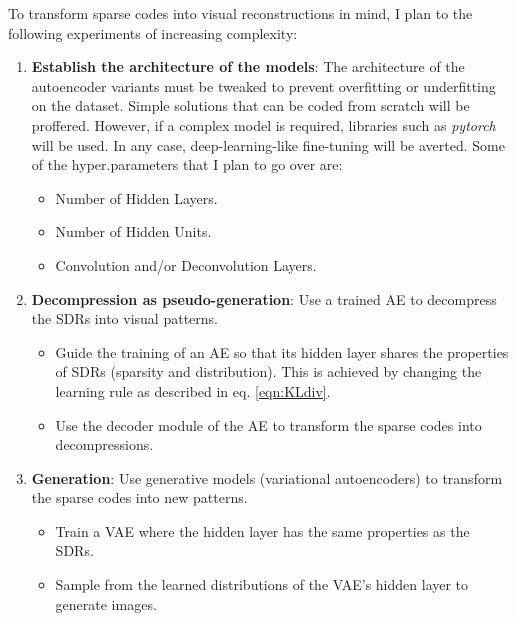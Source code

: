 \documentclass[runningheads]{llncs}
\begin{document}
To transform sparse codes into visual reconstructions in mind, I plan to the following experiments of increasing complexity:
\begin{enumerate}

    \item \textbf{Establish the architecture of the models}: The architecture of the autoencoder variants must be tweaked to prevent overfitting or underfitting on the dataset. Simple solutions that can be coded from scratch will be proffered. However, if a complex model is required, libraries such as \textit{pytorch} will be used. In any case, deep-learning-like fine-tuning will be averted.
    Some of the hyper.parameters that I plan to go over are:
    \begin{itemize}
        \item Number of Hidden Layers.
        \item Number of Hidden Units.
        \item Convolution and/or Deconvolution Layers.
    \end{itemize}
    
    \item \textbf{Decompression as pseudo-generation}: Use a trained AE to decompress the SDRs into visual patterns.
    
    \begin{itemize}
        \item Guide the training of an AE so that its hidden layer shares the properties of SDRs (sparsity and distribution). This is achieved by changing the learning rule as described in eq. \ref{eqn:KLdiv}.
        \item Use the decoder module of the AE to transform the sparse codes into decompressions.
    \end{itemize}
    \item \textbf{Generation}: Use generative models (variational autoencoders) to transform the sparse codes into new patterns.
    \begin{itemize}
        \item Train a VAE where the hidden layer has the same properties as the SDRs.
        \item Sample from the learned distributions of the  VAE's hidden layer to generate images.
    \end{itemize}


\end{enumerate}
\end{document}
